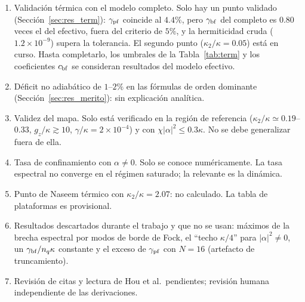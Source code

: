 \documentclass[11pt,a4paper]{article}
\theoremstyle{definition}
\begin{document}
\label{sec:limites}

\begin{enumerate}
\item Validación térmica con el modelo completo. Solo hay un punto validado (Sección~\ref{sec:res_term}): $\gamma_{\rm pf}$ coincide al $4.4\%$, pero $\gamma_{\rm bf}$ del completo es $0.80$ veces el del efectivo, fuera del criterio de $5\%$, y la hermiticidad cruda ($1.2\times10^{-9}$) supera la tolerancia. El segundo punto ($\kappa_2/\kappa=0.05$) está en curso. Hasta completarlo, los umbrales de la Tabla~\ref{tab:term} y los coeficientes $c_{\rm bf}$ se consideran resultados del modelo efectivo.
\item Déficit no adiabático de $1$--$2\%$ en las fórmulas de orden dominante (Sección~\ref{sec:res_merito}): sin explicación analítica.
\item Validez del mapa. Solo está verificado en la región de referencia ($\kappa_2/\kappa\simeq0.19$--$0.33$, $g_z/\kappa\gtrsim10$, $\gamma/\kappa=2\times10^{-4}$) y con $\chi|\alpha|^2\leq0.3\kappa$. No se debe generalizar fuera de ella.
\item Tasa de confinamiento con $\alpha\neq0$. Solo se conoce numéricamente. La tasa espectral no converge en el régimen saturado; la relevante es la dinámica.
\item Punto de Naseem térmico con $\kappa_2/\kappa=2.07$: no calculado. La tabla de plataformas es provisional.
\item Resultados descartados durante el trabajo y que no se usan: máximos de la brecha espectral por modos de borde de Fock, el ``techo $\kappa/4$'' para $|\alpha|^2\neq0$, un $\gamma_{\rm bf}/n_q\kappa$ constante y el exceso de $\gamma_{\rm pf}$ con $N=16$ (artefacto de truncamiento).
\item Revisión de citas y lectura de Hou et al.\ pendientes; revisión humana independiente de las derivaciones.
\end{enumerate}



\end{document}
